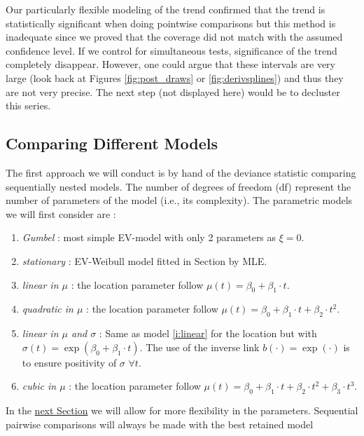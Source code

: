 Our particularly flexible modeling of the trend confirmed that the trend is statistically significant when doing pointwise comparisons but this method is inadequate since we proved that the coverage did not match with the assumed confidence level. If we control for simultaneous tests, significance of the trend completely disappear. However, one could argue that these intervals are very large (look back at Figures \ref{fig:post_draws} or \ref{fig:derivsplines}) and thus they are not very precise. The next step (not displayed here) would be to decluster this series.



\subsection{Comparing Different Models}\label{sec:comp0}


The first approach we will conduct is by hand of the deviance statistic comparing sequentially nested models. The number of degrees of freedom (df) represent the number of parameters of the model (i.e., its complexity). The parametric models we will first consider are :

\begin{enumerate}
	\item \emph{Gumbel} : most simple EV-model with only 2 parameters as $\xi=0$.
	\item \emph{stationary} : EV-Weibull model fitted in Section by MLE.
	\item\label{i:linear} \emph{linear in $\mu$} : the location parameter follow $\mu(t)=\beta_0+\beta_1\cdot t$.
	\item \emph{quadratic in $\mu$} :  the location parameter follow $\mu(t)=\beta_0+\beta_1\cdot t+\beta_2\cdot t^2$.
	\item \emph{linear in $\mu$ and $\sigma$} : Same as model \ref{i:linear} for the location but with $\sigma(t)=\exp(\beta_0+\beta_1\cdot t)$. The use of the inverse link $b(\cdot)=\exp(\cdot)$ is to ensure positivity of $\sigma$ $\forall t$.
	\item \emph{cubic in $\mu$} : the location parameter follow $\mu(t)=\beta_0+\beta_1\cdot t+\beta_2\cdot t^2+\beta_3\cdot t^3$.
\end{enumerate}


In the \hyperref[sec:nnxp]{next Section} we will allow for more flexibility in the parameters.
Sequential pairwise comparisons will always be made with the best retained model

